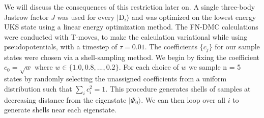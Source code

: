 \documentclass{article}
\begin{document}
We will discuss the consequences of this restriction later on.
A single three-body Jastrow factor $J$ was used for every $|\text{D}_i\rangle$ and was optimized on the lowest energy UKS state using a linear energy optimization method.
The FN-DMC calculations were conducted with T-moves, to make the calculation variational while using pseudopotentials, with a timestep of $\tau = 0.01$.
The coefficients $\{c_j\}$ for our sample states were chosen via a shell-sampling method. 
We begin by fixing the coefficient $c_0 = \sqrt{w}$ where $w \in \{1.0, 0.8, ..., 0.2\}$. 
For each choice of $w$ we sample n = 5 states by randomly selecting the unassigned coefficients from a uniform distribution such that $\sum_i c_i^2 = 1$. 
This procedure generates shells of samples at decreasing distance from the eigenstate $|\Phi_0\rangle$. 
We can then loop over all $i$ to generate shells near each eigenstate.
\end{document}

